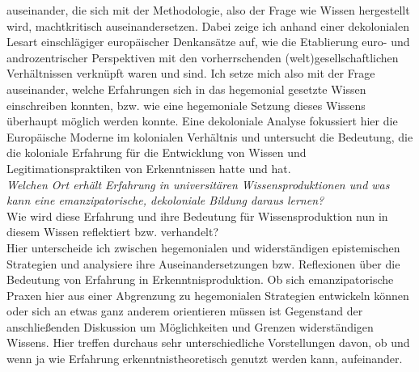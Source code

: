 auseinander, die sich mit der Methodologie, also der Frage wie Wissen
hergestellt wird, machtkritisch auseinandersetzen. Dabei zeige ich anhand einer
dekolonialen Lesart einschlägiger europäischer Denkansätze auf, wie die
Etablierung euro- und androzentrischer Perspektiven mit den vorherrschenden
(welt)gesellschaftlichen Verhältnissen verknüpft waren und sind. Ich setze mich
also mit der Frage auseinander, welche Erfahrungen sich in das hegemonial
gesetzte Wissen einschreiben konnten, bzw. wie eine hegemoniale Setzung dieses
Wissens überhaupt möglich werden konnte. Eine dekoloniale Analyse fokussiert
hier die Europäische Moderne im kolonialen Verhältnis und untersucht die
Bedeutung, die die koloniale Erfahrung für die Entwicklung von Wissen und
Legitimationspraktiken von Erkenntnissen hatte und hat.\\[0.75em]
\textit{Welchen Ort erhält Erfahrung in universitären Wissensproduktionen und
was kann eine emanzipatorische, dekoloniale Bildung daraus lernen? }\\
Wie wird diese Erfahrung und ihre Bedeutung für Wissensproduktion nun in diesem
Wissen reflektiert bzw. verhandelt?\\ Hier unterscheide ich zwischen
hegemonialen und widerständigen epistemischen Strategien und analysiere ihre
Auseinandersetzungen bzw. Reflexionen über die Bedeutung von Erfahrung in
Erkenntnisproduktion. Ob sich emanzipatorische Praxen hier aus einer Abgrenzung
zu hegemonialen Strategien entwickeln können oder sich an etwas ganz anderem
orientieren müssen ist Gegenstand der anschließenden Diskussion um
Möglichkeiten und Grenzen widerständigen Wissens. Hier treffen durchaus sehr
unterschiedliche Vorstellungen davon, ob und wenn ja wie Erfahrung
erkenntnistheoretisch genutzt werden kann, aufeinander.\\

